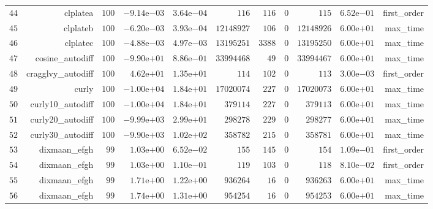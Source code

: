 \documentclass[varwidth=20cm,crop=true]{standalone}
\begin{document}
\begin{longtable}{rrrrrrrrrrr}
  \(    44\) & clplatea & \(   100\) & \(-9.14\)e\(-03\) & \( 3.64\)e\(-04\) & \(   116\) & \(   116\) & \(     0\) & \(   115\) & \( 6.52\)e\(-01\) & first\_order \\
  \(    45\) & clplateb & \(   100\) & \(-6.20\)e\(-03\) & \( 3.93\)e\(-04\) & \(12148927\) & \(   106\) & \(     0\) & \(12148926\) & \( 6.00\)e\(+01\) & max\_time \\
  \(    46\) & clplatec & \(   100\) & \(-4.88\)e\(-03\) & \( 4.97\)e\(-03\) & \(13195251\) & \(  3388\) & \(     0\) & \(13195250\) & \( 6.00\)e\(+01\) & max\_time \\
  \(    47\) & cosine\_autodiff & \(   100\) & \(-9.90\)e\(+01\) & \( 8.86\)e\(-01\) & \(33994468\) & \(    49\) & \(     0\) & \(33994467\) & \( 6.00\)e\(+01\) & max\_time \\
  \(    48\) & cragglvy\_autodiff & \(   100\) & \( 4.62\)e\(+01\) & \( 1.35\)e\(+01\) & \(   114\) & \(   102\) & \(     0\) & \(   113\) & \( 3.00\)e\(-03\) & first\_order \\
  \(    49\) & curly & \(   100\) & \(-1.00\)e\(+04\) & \( 1.84\)e\(+01\) & \(17020074\) & \(   227\) & \(     0\) & \(17020073\) & \( 6.00\)e\(+01\) & max\_time \\
  \(    50\) & curly10\_autodiff & \(   100\) & \(-1.00\)e\(+04\) & \( 1.84\)e\(+01\) & \(379114\) & \(   227\) & \(     0\) & \(379113\) & \( 6.00\)e\(+01\) & max\_time \\
  \(    51\) & curly20\_autodiff & \(   100\) & \(-9.99\)e\(+03\) & \( 2.99\)e\(+01\) & \(298278\) & \(   229\) & \(     0\) & \(298277\) & \( 6.00\)e\(+01\) & max\_time \\
  \(    52\) & curly30\_autodiff & \(   100\) & \(-9.90\)e\(+03\) & \( 1.02\)e\(+02\) & \(358782\) & \(   215\) & \(     0\) & \(358781\) & \( 6.00\)e\(+01\) & max\_time \\
  \(    53\) & dixmaan\_efgh & \(    99\) & \( 1.03\)e\(+00\) & \( 6.52\)e\(-02\) & \(   155\) & \(   145\) & \(     0\) & \(   154\) & \( 1.09\)e\(-01\) & first\_order \\
  \(    54\) & dixmaan\_efgh & \(    99\) & \( 1.03\)e\(+00\) & \( 1.10\)e\(-01\) & \(   119\) & \(   103\) & \(     0\) & \(   118\) & \( 8.10\)e\(-02\) & first\_order \\
  \(    55\) & dixmaan\_efgh & \(    99\) & \( 1.71\)e\(+00\) & \( 1.22\)e\(+00\) & \(936264\) & \(    16\) & \(     0\) & \(936263\) & \( 6.00\)e\(+01\) & max\_time \\
  \(    56\) & dixmaan\_efgh & \(    99\) & \( 1.74\)e\(+00\) & \( 1.31\)e\(+00\) & \(954254\) & \(    16\) & \(     0\) & \(954253\) & \( 6.00\)e\(+01\) & max\_time \\

\end{longtable}
\end{document}
